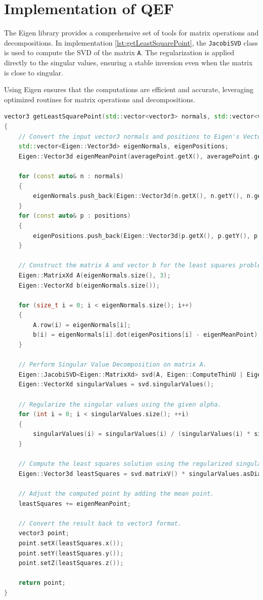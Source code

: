 \section{Implementation of QEF}

The Eigen library provides a comprehensive set of tools for matrix operations and decompositions. In implementation \ref{lst:getLeastSquarePoint}, the \texttt{JacobiSVD} class is used to compute the SVD of the matrix \texttt{A}. The regularization is applied directly to the singular values, ensuring a stable inversion even when the matrix is close to singular.

Using Eigen ensures that the computations are efficient and accurate, leveraging optimized routines for matrix operations and decompositions.

\vspace{2mm}
\begin{lstlisting}[language=C++, caption=Calculation of Quadratic Error Function for a cell, label=lst:getLeastSquarePoint]
vector3 getLeastSquarePoint(std::vector<vector3> normals, std::vector<vector3> positions, vector3 averagePoint, double alpha)
{
	// Convert the input vector3 normals and positions to Eigen's Vector3d format.
    std::vector<Eigen::Vector3d> eigenNormals, eigenPositions;
    Eigen::Vector3d eigenMeanPoint(averagePoint.getX(), averagePoint.getY(), averagePoint.getZ());

    for (const auto& n : normals)
    {
        eigenNormals.push_back(Eigen::Vector3d(n.getX(), n.getY(), n.getZ()));
    }
    for (const auto& p : positions)
    {
        eigenPositions.push_back(Eigen::Vector3d(p.getX(), p.getY(), p.getZ()));
    }

    // Construct the matrix A and vector b for the least squares problem.
    Eigen::MatrixXd A(eigenNormals.size(), 3);
    Eigen::VectorXd b(eigenNormals.size());

    for (size_t i = 0; i < eigenNormals.size(); i++)
    {
        A.row(i) = eigenNormals[i];
        b(i) = eigenNormals[i].dot(eigenPositions[i] - eigenMeanPoint);
    }

    // Perform Singular Value Decomposition on matrix A.
    Eigen::JacobiSVD<Eigen::MatrixXd> svd(A, Eigen::ComputeThinU | Eigen::ComputeThinV);
    Eigen::VectorXd singularValues = svd.singularValues();

    // Regularize the singular values using the given alpha.
    for (int i = 0; i < singularValues.size(); ++i)
    {
        singularValues(i) = singularValues(i) / (singularValues(i) * singularValues(i) + alpha);
    }

    // Compute the least squares solution using the regularized singular values.
    Eigen::Vector3d leastSquares = svd.matrixV() * singularValues.asDiagonal() * svd.matrixU().adjoint() * b;

    // Adjust the computed point by adding the mean point.
    leastSquares += eigenMeanPoint;

    // Convert the result back to vector3 format.
    vector3 point;
    point.setX(leastSquares.x());
    point.setY(leastSquares.y());
    point.setZ(leastSquares.z());

    return point;
}
\end{lstlisting}

